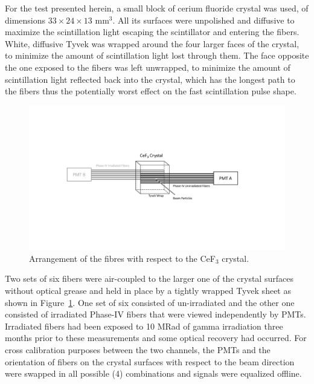\documentclass[a4paper,11pt]{article}
\begin{document}
For the test presented herein, a small block of cerium fluoride crystal was used, of dimensions $33\times 24 \times13$ mm$^3$. All its surfaces were unpolished and diffusive to maximize the scintillation light escaping the scintillator and entering the fibers. White, diffusive Tyvek was wrapped around the four larger faces of the crystal, to minimize the amount of scintillation light lost through them. The face opposite the one exposed to the fibers was left unwrapped, to minimize the amount of scintillation light reflected back into the crystal, which has the longest path to the fibers thus the potentially worst effect on the fast scintillation pulse shape.
\begin{figure}[ht]
\begin{center}\vspace{-1pc}
      \includegraphics[width=10 cm]{Figures/CeF3Arrangement.pdf}
\caption{\small Arrangement of the fibres with respect to the CeF$_3$ crystal.}
    \label{fig:CeF3Arrangement}
\end{center}
\end{figure}
Two sets of six fibers were air-coupled to the larger one of the crystal surfaces without optical grease and held in place by a tightly wrapped Tyvek sheet as shown in Figure~\ref{fig:CeF3Arrangement}. One set of six consisted of un-irradiated and the other one consisted of irradiated Phase-IV fibers that were viewed independently by PMTs.  Irradiated fibers had been exposed to 10 MRad of gamma irradiation three months prior to these measurements and some optical recovery had occurred.  For cross calibration purposes between the two channels, the PMTs and the orientation of fibers on the crystal surfaces with respect to the beam direction were swapped in all possible (4) combinations and signals were equalized offline.
\end{document}
